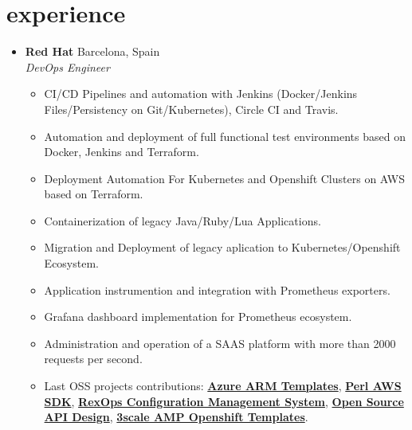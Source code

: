 \documentclass[]{friggeri-cv} %
\renewenvironment{entrylist}{%
  \begin{itemize}[leftmargin=1in]%
}{%
  \end{itemize}
}
\renewcommand{\entry}[4]{%
  \item[#1]
    \textbf{#2}%
    \hfill%
    {\footnotesize\addfontfeature{Color=lightgray} #3}\\%
    #4\vspace{\parsep}%
  }
\begin{document}
\section{experience}
\begin{entrylist}

\entry
{2017--2018}
{Red Hat}
{Barcelona, Spain}
{\emph{DevOps Engineer} 
\begin{itemize}[label=\textbullet]
    \item CI/CD Pipelines and automation with Jenkins (Docker/Jenkins Files/Persistency on Git/Kubernetes), Circle CI and Travis.
    \item Automation and deployment of full functional test environments based on Docker, Jenkins and Terraform.
    \item Deployment Automation For Kubernetes and Openshift Clusters on AWS based on Terraform.
    \item Containerization of legacy Java/Ruby/Lua Applications.
    \item Migration and Deployment of legacy aplication to Kubernetes/Openshift Ecosystem.
    \item Application instrumention and integration with Prometheus exporters. 
    \item Grafana dashboard implementation for Prometheus ecosystem. 
    \item Administration and operation of a SAAS platform with more than 2000 requests per second.
    \item Last OSS projects contributions: \href{https://github.com/Azure/azure-quickstart-templates}{\textbf{Azure ARM Templates}}, \href{https://github.com/pplu/aws-sdk-perl}{\textbf{Perl AWS SDK}}, \href{https://github.com/RexOps/Rex}{\textbf{RexOps Configuration Management System}}, \href{https://github.com/Apicurio/apicurio-studio}{\textbf{Open Source API Design}}, \href{https://github.com/3scale/3scale-amp-openshift-templates}{\textbf{3scale AMP Openshift Templates}}.
\end{itemize}}


\end{entrylist}
\end{document}
